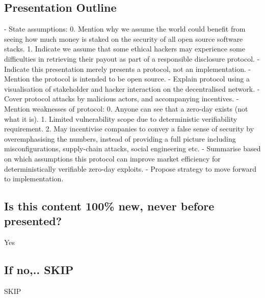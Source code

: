 \documentclass{article}
\begin{document}
\subsection{Presentation Outline}
- State assumptions: 
0. Mention why we assume the world could benefit from seeing how much money is staked on the security of all open source software stacks. 
1. Indicate we assume that some ethical hackers may experience some difficulties in retrieving their payout as part of a responsible disclosure protocol.
- Indicate this presentation merely presents a protocol, not an implementation.
- Mention the protocol is intended to be open source.
- Explain protocol using a visualisation of stakeholder and hacker interaction on the decentralised network.
- Cover protocol attacks by malicious actors, and accompanying incentives.
- Mention weaknesses of protocol: 
0. Anyone can see that a zero-day exists (not what it is). 
1. Limited vulnerability scope due to deterministic verifiability requirement. 
2. May incentivise companies to convey a false sense of security by overemphasising the numbers, instead of providing a full picture including misconfigurations, supply-chain attacks, social engineering etc.
- Summarise based on which assumptions this protocol can improve market efficiency for deterministically verifiable zero-day exploits. 
- Propose strategy to move forward to implementation.
\subsection{Is this content 100\% new, never before presented?}
Yes
\subsection{If no,.. SKIP}
SKIP
\end{document}

